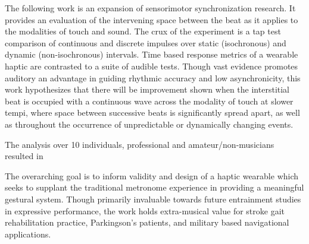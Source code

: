 
\setlength{\parskip}{1em}
\setlength{\parindent}{0em}

\noindent

The following work is an expansion of sensorimotor synchronization research. It provides an evaluation of the intervening space between the beat as it applies to the modalities of touch and sound. The crux of the experiment is a tap test comparison of continuous and discrete impulses over static (isochronous) and dynamic (non-isochronous) intervals. Time based response metrics of a wearable haptic are contrasted to a suite of audible tests. Though vast evidence promotes auditory an advantage in guiding rhythmic accuracy and low asynchronicity, this work hypothesizes that there will be improvement shown when the interstitial beat is occupied with a continuous wave across the modality of touch at slower tempi, where space between successive beats is significantly spread apart, as well as throughout the occurrence of unpredictable or dynamically changing events. 

The analysis over 10 individuals, professional and amateur/non-musicians resulted in 


The overarching goal is to inform validity and design of a haptic wearable which seeks to supplant the traditional metronome experience in providing a meaningful gestural system. Though primarily invaluable towards future entrainment studies in expressive performance, the work holds extra-musical value for stroke gait rehabilitation practice, Parkingson's patients, and military based navigational applications.
